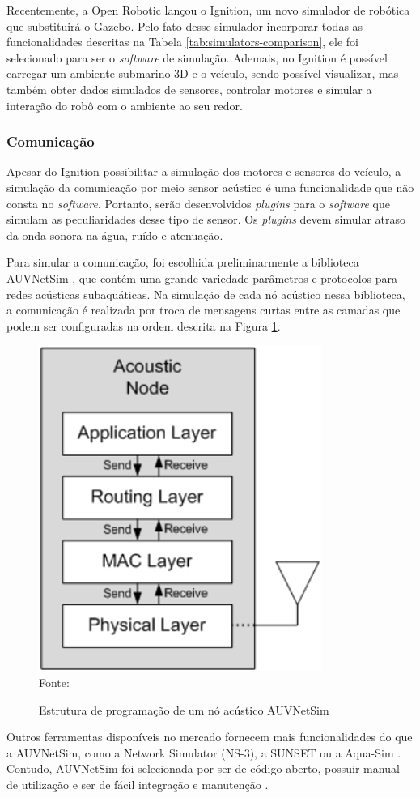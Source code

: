 Recentemente, a Open Robotic lançou o Ignition, um novo simulador de robótica que substituirá o Gazebo. Pelo fato desse simulador incorporar todas as funcionalidades descritas na Tabela \ref{tab:simulators-comparison}, ele foi selecionado para ser o \textit{software} de simulação. Ademais, no Ignition é possível carregar um ambiente submarino 3D e o veículo, sendo possível visualizar, mas também obter dados simulados de sensores, controlar motores e simular a interação do robô com o ambiente ao seu redor.

\subsubsection*{Comunicação}
Apesar do Ignition possibilitar a simulação dos motores e sensores do veículo, a simulação da comunicação por meio sensor acústico é uma funcionalidade que não consta no \textit{software}. Portanto, serão desenvolvidos \textit{plugins} para o \textit{software} que simulam as peculiaridades desse tipo de sensor. Os \textit{plugins} devem simular atraso da onda sonora na água, ruído e atenuação.

Para simular a comunicação, foi escolhida preliminarmente a biblioteca AUVNetSim \cite{montana2008auvnetsim}, que contém uma grande variedade parâmetros e protocolos para redes acústicas subaquáticas. Na simulação de cada nó acústico nessa biblioteca, a comunicação é realizada por troca de mensagens curtas entre as camadas que podem ser configuradas na ordem descrita na Figura \ref{fig:auvnetsim}.

\begin{figure}[h]
	\centering
	\caption{Estrutura de programação de um nó acústico AUVNetSim}
	\label{fig:auvnetsim}
	\includegraphics[width=0.3\linewidth]{images/auvnetsim}\\
	\footnotesize Fonte: \cite{montana2008auvnetsim}
\end{figure}

Outros ferramentas disponíveis no mercado fornecem mais funcionalidades do que a AUVNetSim, como a Network Simulator (NS-3), a SUNSET ou a Aqua-Sim \cite{godi2021survey}. Contudo, AUVNetSim foi selecionada por ser de código aberto, possuir manual de utilização e ser de fácil integração e manutenção \cite{montana2008auvnetsim}.

